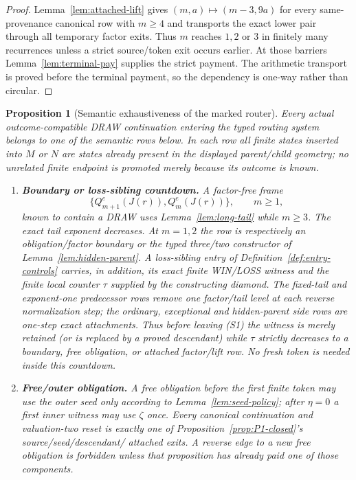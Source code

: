 \documentclass[11pt]{article}
\newtheorem{proposition}[theorem]{Proposition}
\begin{document}
\begin{proof}
Lemma~\ref{lem:attached-lift} gives
$(m,a)\mapsto(m-3,9a)$ for every same-provenance canonical row with
$m\ge4$ and transports the exact lower pair through all temporary factor
exits. Thus $m$ reaches $1,2$ or $3$ in finitely many recurrences unless a
strict source/token exit occurs earlier. At those barriers
Lemma~\ref{lem:terminal-pay} supplies the strict payment. The arithmetic
transport is proved before the terminal payment, so the dependency is
one-way rather than circular.
\end{proof}

\begin{proposition}[Semantic exhaustiveness of the marked router]
\label{prop:P2-closed}
Every actual outcome-compatible DRAW continuation entering the typed routing
system belongs to one of the semantic rows below.  In each row all finite
states inserted into $M$ or $N$ are states already present in the displayed
parent/child geometry; no unrelated finite endpoint is promoted merely because
its outcome is known.

\begin{enumerate}[label=\textnormal{(S\arabic*)},leftmargin=*]
\item \textbf{Boundary or loss-sibling countdown.}  A factor-free frame
\[
 \{Q_{m+1}^e(J(r)),Q_m^e(J(r))\},\qquad m\ge1,
\]
known to contain a DRAW uses Lemma~\ref{lem:long-tail} while $m\ge3$.
The exact tail exponent decreases.  At $m=1,2$ the row is respectively an
obligation/factor boundary or the typed three/two constructor of
Lemma~\ref{lem:hidden-parent}.  A loss-sibling entry of
Definition~\ref{def:entry-controls} carries, in addition, its exact finite
WIN/LOSS witness and the finite local counter $\tau$ supplied by the
constructing diamond.  The fixed-tail and exponent-one predecessor rows
remove one factor/tail level at each reverse normalization step; the
ordinary, exceptional and hidden-parent side rows are one-step exact
attachments.  Thus before leaving (S1) the witness is merely retained (or is
replaced by a proved descendant) while $\tau$ strictly decreases to a
boundary, free obligation, or attached factor/lift row.  No fresh token is
needed inside this countdown.

\item \textbf{Free/outer obligation.}  A free obligation before the first
finite token may use the outer seed only according to
Lemma~\ref{lem:seed-policy}; after $\eta=0$ a first inner witness may use
$\zeta$ once.  Every canonical continuation and valuation-two reset is
exactly one of Proposition~\ref{prop:P1-closed}'s source/seed/descendant/
attached exits.  A reverse edge to a new free obligation is forbidden unless
that proposition has already paid one of those components.


\end{enumerate}
\end{proposition}
\end{document}
